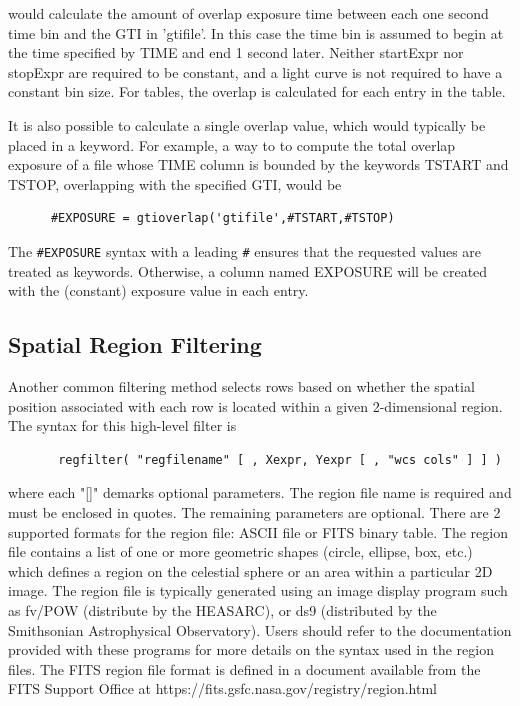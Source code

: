 \documentclass[11pt]{book}
\begin{document}
    would calculate the amount of overlap exposure time between each
    one second time bin and the GTI in 'gtifile'.  In this case the
    time bin is assumed to begin at the time specified by TIME and end
    1 second later.  Neither startExpr nor stopExpr are required to be
    constant, and a light curve is not required to have a constant bin
    size.  For tables, the overlap is calculated for each entry in the
    table.

    It is also possible to calculate a single overlap value, which
    would typically be placed in a keyword.  For example, a way to to
    compute the total overlap exposure of a file whose TIME column is
    bounded by the keywords TSTART and TSTOP, overlapping with the
    specified GTI, would be

\begin{verbatim}
      #EXPOSURE = gtioverlap('gtifile',#TSTART,#TSTOP)
\end{verbatim}

    The \verb+#EXPOSURE+ syntax with a leading \verb+#+ ensures that the
    requested values are treated as keywords.  Otherwise, a column
    named EXPOSURE will be created with the (constant) exposure value
    in each entry.  



\subsection{Spatial Region Filtering}

    Another common  filtering method selects rows based on whether the
    spatial position associated with each row is located within a given
    2-dimensional region.  The syntax for this high-level filter is

\begin{verbatim}
       regfilter( "regfilename" [ , Xexpr, Yexpr [ , "wcs cols" ] ] )
\end{verbatim}
    where each "[]" demarks optional parameters. The region file name
    is required and must be  enclosed in quotes.  The remaining
    parameters are optional.  There are 2 supported formats for the
    region file: ASCII file or FITS binary table.  The region file
    contains a list of one or more geometric shapes (circle,
    ellipse, box, etc.) which defines a region on the celestial sphere
    or an area within a particular 2D image.  The region file is
    typically generated using an image display program such as fv/POW
    (distribute by the HEASARC), or ds9 (distributed by the Smithsonian
    Astrophysical Observatory).  Users should refer to the documentation
    provided with these programs for more details on the syntax used in
    the region files.  The FITS region file format is defined in a document
    available from the FITS Support Office at
    https://fits.gsfc.nasa.gov/registry/region.html
\end{document}
